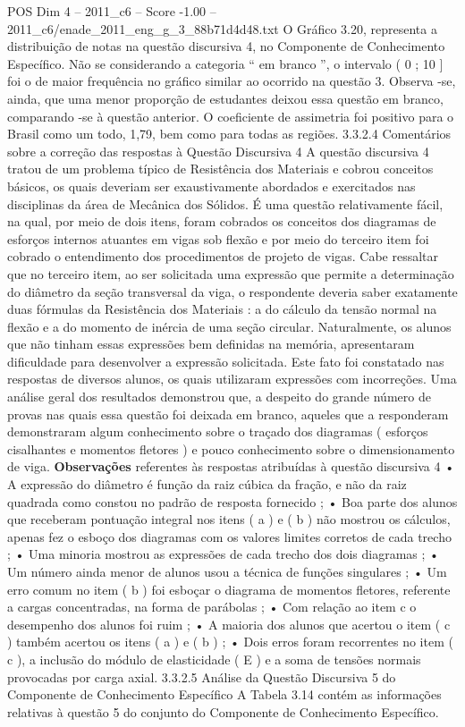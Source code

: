 \begin{textsample}{POS Dim 4 – 2011\_c6 – Score -1.00 – 2011\_c6/enade\_2011\_eng\_g\_3\_88b71d4d48.txt}
O Gráfico 3.20, representa a distribuição de notas na questão discursiva 4, no Componente de Conhecimento Específico.
Não se considerando a categoria “ em branco ”, o intervalo ( 0 ; 10 ] foi o de maior frequência no gráfico similar ao ocorrido na questão 3.
Observa -se, ainda, que uma menor proporção de estudantes deixou essa questão em branco, comparando -se à questão anterior.
O coeficiente de assimetria foi positivo para o Brasil como um todo, 1,79, bem como para todas as regiões. 3.3.2.4 Comentários sobre a correção das respostas à Questão Discursiva 4 A questão discursiva 4 tratou de um problema típico de Resistência dos Materiais e cobrou conceitos básicos, os quais deveriam ser exaustivamente abordados e exercitados nas disciplinas da área de Mecânica dos Sólidos.
É uma questão relativamente fácil, na qual, por meio de dois itens, foram cobrados os conceitos dos diagramas de esforços internos atuantes em vigas sob flexão e por meio do terceiro item foi cobrado o entendimento dos procedimentos de projeto de vigas.
Cabe ressaltar que no terceiro item, ao ser solicitada uma expressão que permite a determinação do diâmetro da seção transversal da viga, o respondente deveria saber exatamente duas fórmulas da Resistência dos Materiais : a do cálculo da tensão normal na flexão e a do momento de inércia de uma seção circular.
Naturalmente, os alunos que não tinham essas expressões bem definidas na memória, apresentaram dificuldade para desenvolver a expressão solicitada.
Este fato foi constatado nas respostas de diversos alunos, os quais utilizaram expressões com incorreções.
Uma análise geral dos resultados demonstrou que, a despeito do grande número de provas nas quais essa questão foi deixada em branco, aqueles que a responderam demonstraram algum conhecimento sobre o traçado dos diagramas ( esforços cisalhantes e momentos fletores ) e pouco conhecimento sobre o dimensionamento de viga. \textbf{Observações} referentes às respostas atribuídas à questão discursiva 4 • A expressão do diâmetro é função da raiz cúbica da fração, e não da raiz quadrada como constou no padrão de resposta fornecido ; • Boa parte dos alunos que receberam pontuação integral nos itens ( a ) e ( b ) não mostrou os cálculos, apenas fez o esboço dos diagramas com os valores limites corretos de cada trecho ; • Uma minoria mostrou as expressões de cada trecho dos dois diagramas ; • Um número ainda menor de alunos usou a técnica de funções singulares ; • Um erro comum no item ( b ) foi esboçar o diagrama de momentos fletores, referente a cargas concentradas, na forma de parábolas ; • Com relação ao item c o desempenho dos alunos foi ruim ; • A maioria dos alunos que acertou o item ( c ) também acertou os itens ( a ) e ( b ) ; • Dois erros foram recorrentes no item ( c ), a inclusão do módulo de elasticidade ( E ) e a soma de tensões normais provocadas por carga axial. 3.3.2.5 Análise da Questão Discursiva 5 do Componente de Conhecimento Específico A Tabela 3.14 contém as informações relativas à questão 5 do conjunto do Componente de Conhecimento Específico.

\end{textsample}

